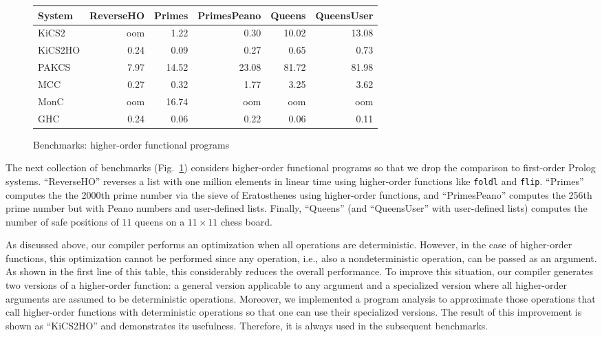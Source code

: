 \documentclass{llncs}
\newcommand{\code}[1]{\mbox{\small\texttt{#1}}}
\begin{document}
\begin{figure}
\centering
\begin{tabular}{|@{~~}l@{~~}|*{5}{@{~~}r@{~~}|}}
\hline
System  & ReverseHO & Primes & PrimesPeano & Queens & QueensUser \\\hline
KiCS2   &      oom  &   1.22 &       0.30  &  10.02 &     13.08  \\
KiCS2HO &     0.24  &   0.09 &       0.27  &   0.65 &      0.73  \\
PAKCS   &     7.97  &  14.52 &      23.08  &  81.72 &     81.98  \\
MCC     &     0.27  &   0.32 &       1.77  &   3.25 &      3.62  \\
MonC    &      oom  &  16.74 &        oom  &    oom &       oom  \\
GHC     &     0.24  &   0.06 &       0.22  &   0.06 &      0.11  \\
\hline
\end{tabular}
\caption{Benchmarks: higher-order functional programs}
 \label{fig:bench-higher-order}
\end{figure}
%
The next collection of benchmarks (Fig.~\ref{fig:bench-higher-order})
considers higher-order functional programs so that we drop
the comparison to first-order Prolog systems.
``ReverseHO'' reverses a list with one million
elements in linear time using higher-order functions
like \code{foldl} and \code{flip}.
``Primes'' computes the the 2000th prime number via the
sieve of Eratosthenes using higher-order functions,
and ``PrimesPeano'' computes the 256th prime number but
with Peano numbers and user-defined lists.
Finally, ``Queens'' (and ``QueensUser'' with user-defined lists)
computes the number of safe positions of $11$ queens on a $11 \times 11$
chess board.

As discussed above, our compiler performs an optimization
when all operations are deterministic. However, in the case
of higher-order functions, this optimization cannot be performed
since any operation, i.e., also a nondeterministic operation,
can be passed as an argument. As shown in the first line of this table,
this considerably reduces the overall performance.
To improve this situation, our compiler generates two versions
of a higher-order function: a general version applicable to any
argument and a specialized version where all higher-order arguments
are assumed to be deterministic operations.
Moreover, we implemented a program analysis
to approximate those operations that call higher-order functions
with deterministic operations so that one can use their
specialized versions. The result of this improvement
is shown as ``KiCS2HO'' and demonstrates its usefulness.
Therefore, it is always used in the subsequent benchmarks.
\end{document}
